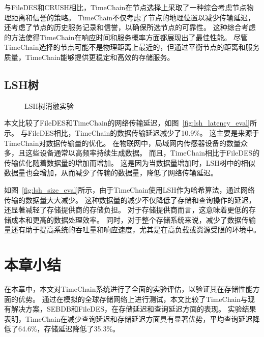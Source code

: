 与FileDES和CRUSH相比，TimeChain在节点选择上采取了一种综合考虑节点物理距离和信誉的策略。
TimeChain不仅考虑了节点的地理位置以减少传输延迟，还考虑了节点的历史服务记录和信誉，以确保所选节点的可靠性。
这种综合考虑的方法使得TimeChain在响应时间和服务概率方面都展现出了最佳性能。
尽管TimeChain选择的节点可能不是物理距离上最近的，但通过平衡节点的距离和服务质量，TimeChain能够提供更稳定和高效的存储服务。

\subsection{LSH树}

\begin{figure*}[t]
    \centering
    \begin{minipage}{1\linewidth}
        \quad
        \caption{LSH树消融实验} 
    \end{minipage}
\end{figure*}
本文比较了FileDES和TimeChain的网络传输延迟，如图~\autoref{fig:lsh_latency_eval}所示。
与FileDES相比，TimeChain的数据传输延迟减少了10.9\%。
这主要是来源于TimeChain对数据传输量的优化。
在物联网中，局域网内传感器设备的数量众多，且这些设备通常以高频率持续生成数据。
而且，TimeChain相比于FileDES的传输优化随着数据量的增加而增加。
这是因为当数据量增加时，LSH树中的相似数据量也会增加，从而减少了传输的数据量，降低了网络传输延迟。

如图~\autoref{fig:lsh_size_eval}所示，由于TimeChain使用LSH作为哈希算法，通过网络传输的数据量大大减少。
这种数据量的减少不仅降低了存储和查询操作的延迟，还显著减轻了存储提供商的存储负担。
对于存储提供商而言，这意味着更低的存储成本和更高的数据处理效率。
同时，对于整个存储系统来说，减少了数据传输量还有助于提高系统的吞吐量和响应速度，尤其是在高负载或资源受限的环境中。

\section{本章小结}
在本章中，本文对TimeChain系统进行了全面的实验评估，以验证其在存储性能方面的优势。
通过在模拟的全球存储网络上进行测试，本文比较了TimeChain与现有解决方案，SEBDB和FileDES，在存储延迟和查询延迟方面的表现。
实验结果表明，TimeChain在减少查询延迟和存储延迟方面具有显著优势，平均查询延迟降低了64.6\%，存储延迟降低了35.3\%。


